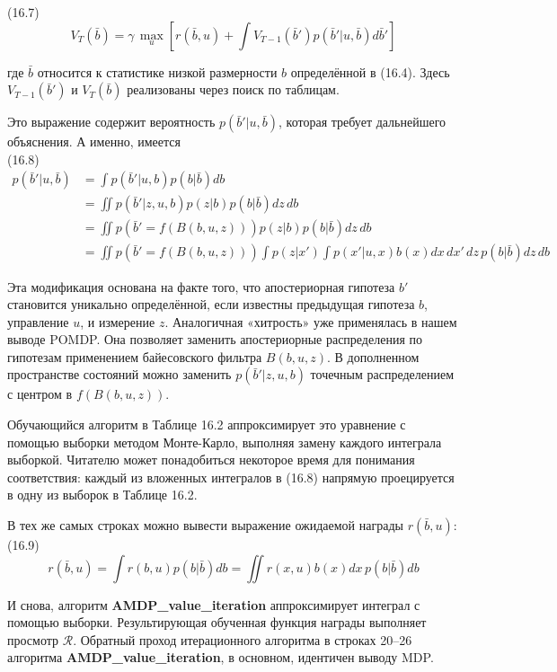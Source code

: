 \documentclass[10pt,a4paper]{article}
\begin{document}
(16.7)
$$V_T(\bar{b})=\gamma\,\underset{u}{\max}\left[ r(\bar{b},u)+\int V_{T-1}(\bar{b}')p(\bar{b}'|u,\bar{b})d\bar{b}'\right] $$

где $\bar{b}$ относится к статистике низкой размерности $b$ определённой в (16.4).  Здесь
$V_{T-1}(\bar{b}')$ и $V_T (\bar{b})$ реализованы через поиск по таблицам.

Это выражение содержит вероятность $p(\bar{b}'|u,\bar{b})$, которая требует дальнейшего объяснения. А именно, имеется\\

(16.8)
\begin{equation*}
\begin{split}
p(\bar{b}'|u,\bar{b})&=\int p(\bar{b}'|u,b)p(b|\bar{b})db\\
&=\iint p(\bar{b}'|z,u,b)p(z|b)p(b|\bar{b})dz\,db\\
&=\iint p(\bar{b}'=f(B(b,u,z)))p(z|b)p(b|\bar{b})dz\,db\\
&=\iint p(\bar{b}'=f(B(b,u,z)))\int p(z|x')\int p(x'|u,x)b(x)dx\,dx'\,dz\,p(b|\bar{b})dz\,db
\end{split}
\end{equation*}

Эта модификация основана на факте того, что апостериорная гипотеза $b'$ становится уникально определённой, если известны предыдущая гипотеза $b$, управление $u$, и измерение $z$. Аналогичная «хитрость» уже применялась в нашем выводе POMDP. Она позволяет заменить апостериорные распределения по гипотезам применением байесовского фильтра $B(b, u, z)$. В дополненном пространстве состояний можно заменить  $p(\bar{b}'  |  z, u, b)$ точечным распределением с центром в $f (B(b, u, z))$.

Обучающийся алгоритм в Таблице 16.2 аппроксимирует это уравнение с помощью выборки методом Монте-Карло, выполняя замену каждого интеграла выборкой. Читателю может понадобиться некоторое время для понимания соответствия: каждый из вложенных интегралов в (16.8) напрямую проецируется в одну из выборок в Таблице 16.2.

В тех же самых строках можно вывести выражение ожидаемой награды $r(\bar{b}, u)$:\\

(16.9)
$$r(\bar{b},u)=\int r(b,u)p(b|\bar{b})db=\iint r(x,u)b(x)dx\,p(b|\bar{b})db$$

И снова, алгоритм \textbf{AMDP\_value\_iteration} аппроксимирует интеграл с помощью выборки. Результирующая обученная функция награды выполняет просмотр  $\mathcal{R}$. Обратный проход итерационного алгоритма в строках  20–26  алгоритма \textbf{AMDP\_value\_iteration}, в основном, идентичен выводу MDP.
\end{document}
